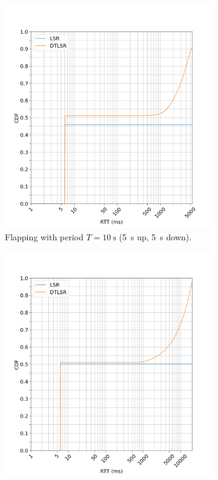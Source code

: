 \documentclass[withindex,glossary,openany]{cam-thesis}
\begin{document}
\begin{figure}[H]
\centering
\begin{subfigure}{.5\textwidth}
  \centering
  \includegraphics[width=1\linewidth]{delay_partition_flap5}
  \caption{Flapping with period $T=\SI{10}{\s}$ (\SI{5}{\s} up, \SI{5}{\s} down).}
  \label{fig:partition_5}
\end{subfigure}%
\begin{subfigure}{.5\textwidth}
  \centering
  \includegraphics[width=1\linewidth]{delay_partition_flap20}

\end{subfigure}
\end{figure}
\end{document}
